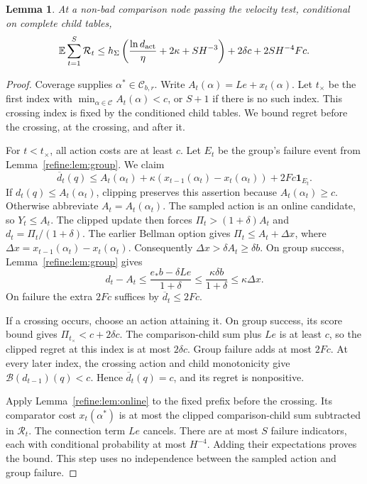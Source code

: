 \documentclass[11pt]{article}
\newtheorem{lemma}[theorem]{Lemma}
\theoremstyle{definition}
\newcommand{\E}{\mathbb E}
\newcommand{\cB}{\mathcal B}
\newcommand{\cC}{\mathcal C}
\newcommand{\1}{\mathbf 1}
\begin{document}
\begin{lemma}\label{refine:lem:coveredregret}
At a non-bad comparison node passing the velocity test, conditional on complete child tables,
\[
 \E\sum_{t=1}^S\mathcal R_t
 \le h_\Sigma\left(\frac{\ln d_{\rm act}}{\eta}+2\kappa+SH^{-3}\right)
       +2\delta c+2SH^{-4}Fc.
\]
\end{lemma}
\begin{proof}
Coverage supplies $\alpha^*\in\cC_{b,r}$.
Write $A_t(\alpha)=Le+x_t(\alpha)$.
Let $t_\times$ be the first index with
$\min_{\alpha\in\cC}A_t(\alpha)<c$, or $S+1$ if there is no such index.
This crossing index is fixed by the conditioned child tables.
We bound regret before the crossing, at the crossing, and after it.

For $t<t_\times$, all action costs are at least $c$. Let $E_t$ be the group's failure event from Lemma~\ref{refine:lem:group}. We claim
\[
 \overline d_t(q)\le A_t(\alpha_t)+\kappa(x_{t-1}(\alpha_t)-x_t(\alpha_t))+2Fc\mathbf1_{E_t}.
\]
If $d_t(q)\le A_t(\alpha_t)$, clipping preserves this assertion because
$A_t(\alpha_t)\ge c$. Otherwise abbreviate $A_t=A_t(\alpha_t)$.
The sampled action is an online candidate, so $Y_t\le A_t$.
The clipped update then forces
$\Pi_t>(1+\delta)A_t$ and $d_t=\Pi_t/(1+\delta)$.
The earlier Bellman option gives $\Pi_t\le A_t+\Delta x$, where
$\Delta x=x_{t-1}(\alpha_t)-x_t(\alpha_t)$.
Consequently $\Delta x>\delta A_t\ge\delta b$.
On group success, Lemma~\ref{refine:lem:group} gives
\[
 d_t-A_t\le\frac{e_*b-\delta Le}{1+\delta}
 \le\frac{\kappa\delta b}{1+\delta}\le\kappa\Delta x.
\]
On failure the extra $2Fc$ suffices by $\overline d_t\le2Fc$.

If a crossing occurs, choose an action attaining it.
On group success, its score bound gives
$\Pi_{t_\times}<c+2\delta c$.
The comparison-child sum plus $Le$ is at least $c$, so the clipped
regret at this index is at most $2\delta c$.
Group failure adds at most $2Fc$.
At every later index, the crossing action and child monotonicity give
$\cB(d_{t-1})(q)<c$. Hence $\overline d_t(q)=c$, and its regret is
nonpositive.

Apply Lemma~\ref{refine:lem:online} to the fixed prefix before the crossing.
Its comparator cost $x_t(\alpha^*)$ is at most the clipped comparison-child
sum subtracted in $\mathcal R_t$.
The connection term $Le$ cancels.
There are at most $S$ failure indicators, each with conditional
probability at most $H^{-4}$.
Adding their expectations proves the bound.
This step uses no independence between the sampled action and group
failure.
\end{proof}
\end{document}
